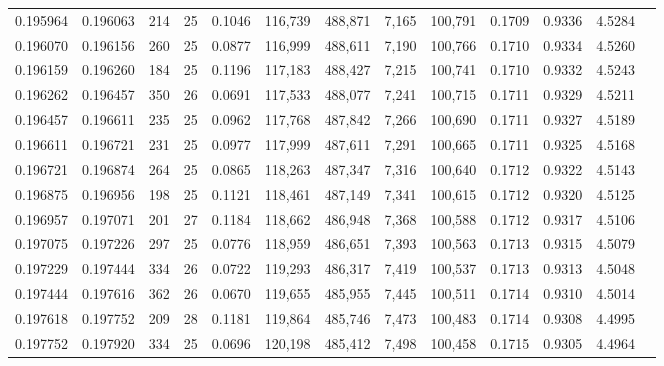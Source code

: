 \begin{tabular}{rrrrrrrrrrrrr}
0.195964 & 0.196063 &   214 &  25 &                                     0.1046 & 116,739 & 488,871 &   7,165 & 100,791 & 0.1709 & 0.9336 & 4.5284 \\
0.196070 & 0.196156 &   260 &  25 &                                     0.0877 & 116,999 & 488,611 &   7,190 & 100,766 & 0.1710 & 0.9334 & 4.5260 \\
0.196159 & 0.196260 &   184 &  25 &                                     0.1196 & 117,183 & 488,427 &   7,215 & 100,741 & 0.1710 & 0.9332 & 4.5243 \\
0.196262 & 0.196457 &   350 &  26 &                                     0.0691 & 117,533 & 488,077 &   7,241 & 100,715 & 0.1711 & 0.9329 & 4.5211 \\
0.196457 & 0.196611 &   235 &  25 &                                     0.0962 & 117,768 & 487,842 &   7,266 & 100,690 & 0.1711 & 0.9327 & 4.5189 \\
0.196611 & 0.196721 &   231 &  25 &                                     0.0977 & 117,999 & 487,611 &   7,291 & 100,665 & 0.1711 & 0.9325 & 4.5168 \\
0.196721 & 0.196874 &   264 &  25 &                                     0.0865 & 118,263 & 487,347 &   7,316 & 100,640 & 0.1712 & 0.9322 & 4.5143 \\
0.196875 & 0.196956 &   198 &  25 &                                     0.1121 & 118,461 & 487,149 &   7,341 & 100,615 & 0.1712 & 0.9320 & 4.5125 \\
0.196957 & 0.197071 &   201 &  27 &                                     0.1184 & 118,662 & 486,948 &   7,368 & 100,588 & 0.1712 & 0.9317 & 4.5106 \\
0.197075 & 0.197226 &   297 &  25 &                                     0.0776 & 118,959 & 486,651 &   7,393 & 100,563 & 0.1713 & 0.9315 & 4.5079 \\
0.197229 & 0.197444 &   334 &  26 &                                     0.0722 & 119,293 & 486,317 &   7,419 & 100,537 & 0.1713 & 0.9313 & 4.5048 \\
0.197444 & 0.197616 &   362 &  26 &                                     0.0670 & 119,655 & 485,955 &   7,445 & 100,511 & 0.1714 & 0.9310 & 4.5014 \\
0.197618 & 0.197752 &   209 &  28 &                                     0.1181 & 119,864 & 485,746 &   7,473 & 100,483 & 0.1714 & 0.9308 & 4.4995 \\
0.197752 & 0.197920 &   334 &  25 &                                     0.0696 & 120,198 & 485,412 &   7,498 & 100,458 & 0.1715 & 0.9305 & 4.4964 \\

\end{tabular}
